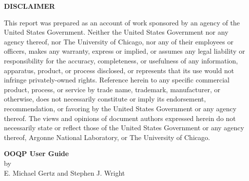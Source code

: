 \documentclass[twoside]{article}
\begin{document}
\begin{center}
{\bf DISCLAIMER}
\end{center}

\noindent
This
report was prepared as an account of work sponsored by an agency of the United States Government.  Neither the United States
Government nor any agency thereof, nor The University of Chicago, nor any of
their employees or officers, makes any warranty, express or implied, or assumes any legal liability or
responsibility for the accuracy, completeness, or usefulness of any
information, apparatus, product, or process disclosed, or represents that its use
would not infringe privately-owned rights.
Reference herein to any specific commercial product, process, or service by trade name,
trademark, manufacturer, or otherwise, does not necessarily constitute
or imply its endorsement, recommendation, or favoring by the United
States Government or any agency thereof.  The views and opinions of document
authors expressed herein do not necessarily state or reflect those of the
United States Government or any agency thereof, Argonne National
Laboratory, or The University of Chicago.
\newpage
  \tableofcontents
\newpage
{}
\setcounter{page}{1}
\begin{center}
{\large\bf OOQP User Guide} \\ [2ex]
by \\ [2ex]
E. Michael Gertz and Stephen J. Wright
\end{center}
\vspace{.2in}
\begin{abstract}
OOQP is an object-oriented software package for solving convex
quad\-ratic programming problems (QP).  We describe the design of
OOQP, and document how to use OOQP in its default configuration. We
further describe OOQP as a development framework, and outline how to
develop custom solvers that solve QPs with exploitable structure or use
specialized linear algebra.
\end{abstract}












\newpage
\appendix

\end{document}
